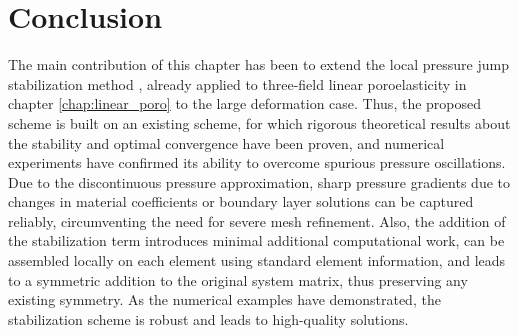 \section{Conclusion}

The main contribution of this chapter has been to extend the local pressure jump stabilization method \cite{burman2007unified}, already applied to three-field linear poroelasticity in chapter \ref{chap:linear_poro} to the large deformation case. Thus, the proposed scheme is built on an existing scheme, for which rigorous theoretical results about the stability and optimal convergence have been proven, and numerical experiments have confirmed its ability to overcome spurious pressure oscillations. Due to the discontinuous pressure approximation, sharp pressure gradients due to changes in material coefficients or boundary layer solutions can be captured reliably, circumventing the need for severe mesh refinement. Also, the addition of the stabilization term introduces minimal additional computational work, can be assembled locally on each element using standard element information, and leads to a symmetric addition to the original system matrix, thus preserving any existing symmetry. As the numerical examples have demonstrated, the stabilization scheme is robust and leads to high-quality solutions.




